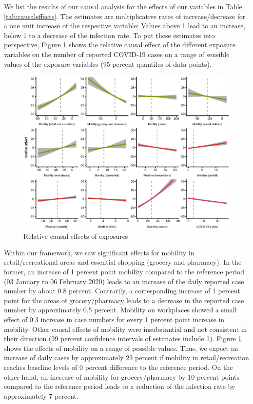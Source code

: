 \documentclass[]{elsarticle} %
\makeatletter
\def\maxwidth{\ifdim\Gin@nat@width>\linewidth\linewidth
\else\Gin@nat@width\fi}
\let\Oldincludegraphics\includegraphics
\renewcommand{\includegraphics}[1]{\Oldincludegraphics[width=\maxwidth]{#1}}
\makeatother
\begin{document}
We list the results of our causal analysis for the effects of our variables in Table \ref{tab:causaleffects}. The estimates are multiplicative rates of increase/decrease for a one unit increase of the respective variable: Values above 1 lead to an increase, below 1 to a decrease of the infection rate. To put these estimates into perspective, Figure \ref{fig:effectsrange} shows the relative causal effect of the different exposure variables on the number of reported COVID-19 cases on a range of sensible values of the exposure variables (95 percent quantiles of data points).

\begin{figure}
\centering
\includegraphics{figures/f_exposure_vs_effect.eps}
\caption{\label{fig:effectsrange}Relative causal effects of exposures}
\end{figure}

Within our framework, we saw significant effects for mobility in retail/recreational areas and essential shopping (grocery and pharmacy). In the former, an increase of 1 percent point mobility compared to the reference period (03 January to 06 February 2020) leads to an increase of the daily reported case number by about 0.8 percent. Contrarily, a corresponding increase of 1 percent point for the areas of grocery/pharmacy leads to a decrease in the reported case number by approximately 0.5 percent. Mobility on workplaces showed a small effect of 0.3 increase in case numbers for every 1 percent point increase in mobility. Other causal effects of mobility were insubstantial and not consistent in their direction (99 percent confidence intervals of estimates include 1). Figure \ref{fig:effectsrange} shows the effects of mobility on a range of possible values. Thus, we expect an increase of daily cases by approximately 23 percent if mobility in retail/recreation reaches baseline levels of 0 percent difference to the reference period. On the other hand, an increase of mobility for grocery/pharmacy by 10 percent points compared to the reference period leads to a reduction of the infection rate by approximately 7 percent.
\end{document}
